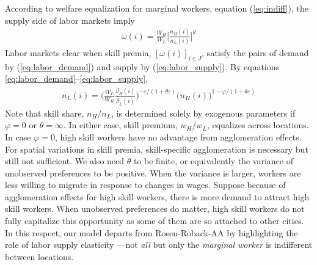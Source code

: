 \documentclass{article}
\begin{document}
According to welfare equalization for marginal workers, equation (\ref{eq:indiff}), the supply side of labor markets imply
\begin{eqnarray}\label{eq:labor_supply}
	\omega(i) = \frac{W_H}{W_L} \Big[ \frac{n_H(i)}{n_L(i)} \Big]^{\theta}
\end{eqnarray}
Labor markets clear when skill premia, $[\omega(i)]_{i \in J}$, satisfy the pairs of demand by (\ref{eq:labor_demand}) and supply by (\ref{eq:labor_supply}). By equations \ref{eq:labor_demand}--\ref{eq:labor_supply},
\begin{eqnarray}\label{eq:labor_demand_supply}
n_L(i) = \Big( \frac{W_L}{W_H} \frac{\bar{\beta}_H(i)}{\bar{\beta}_L(i)} \Big)^{-\varepsilon/(1+\theta \varepsilon)} \Big( n_H(i) \Big)^{1-\varphi/(1+\theta \varepsilon)}
\end{eqnarray}
Note that skill share, $n_H/n_L$, is determined solely by exogenous parameters if $\varphi=0$ or $\theta=\infty$. In either case, skill premium, $w_H/w_L$, equalizes across locations. In case $\varphi=0$, high skill workers have no advantage from agglomeration effects. For spatial variations in skill premia, skill-specific agglomeration is necessary but still not sufficient. We also need $\theta$ to be finite, or equivalently the variance of unobserved preferences to be positive. When the variance is larger, workers are less willing to migrate in response to changes in wages.
Suppose because of agglomeration effects for high skill workers, there is more demand to attract high skill workers. When unobserved preferences do matter, high skill workers do not fully capitalize this opportunity as some of them are so attached to other cities. In this respect, our model departs from Rosen-Roback-AA by highlighting the role of labor supply elasticity ---not \textit{all} but only the \textit{marginal worker} is indifferent between locations.
\end{document}
